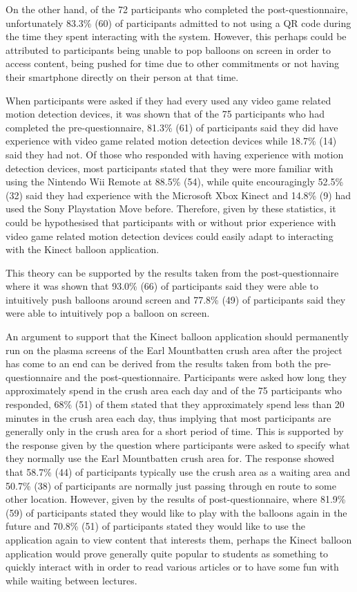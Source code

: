 On the other hand, of the 72 participants who completed the post-questionnaire, unfortunately 83.3\% (60) of participants admitted to not using a QR code during the time they spent interacting with the system. However, this perhaps could be attributed to participants being unable to pop balloons on screen in order to access content, being pushed for time due to other commitments or not having their smartphone directly on their person at that time.

When participants were asked if they had every used any video game related motion detection devices, it was shown that of the 75 participants who had completed the pre-questionnaire, 81.3\% (61) of participants said they did have experience with video game related motion detection devices while 18.7\% (14) said they had not. Of those who responded with having experience with motion detection devices, most participants stated that they were more familiar with using the Nintendo Wii Remote at 88.5\% (54), while quite encouragingly 52.5\% (32) said they had experience with the Microsoft Xbox Kinect and 14.8\% (9) had used the Sony Playstation Move before. Therefore, given by these statistics, it could be hypothesised that participants with or without prior experience with video game related motion detection devices could easily adapt to interacting with the Kinect balloon application.

This theory can be supported by the results taken from the post-questionnaire where it was shown that 93.0\% (66) of participants said they were able to intuitively push balloons around screen and 77.8\% (49) of participants said they were able to intuitively pop a balloon on screen.

An argument to support that the Kinect balloon application should permanently run on the  plasma screens of the Earl Mountbatten crush area after the project has come to an end can be derived from the results taken from both the pre-questionnaire and the post-questionnaire. Participants were asked how long they approximately spend in the crush area each day and of the 75 participants who responded, 68\% (51) of them stated that they approximately spend less than 20 minutes in the crush area each day, thus implying that most participants are generally only in the crush area for a short period of time. This is supported by the response given by the question where participants were asked to specify what they normally use the Earl Mountbatten crush area for. The response showed that 58.7\% (44) of participants typically use the crush area as a waiting area and 50.7\% (38) of participants are normally just passing through en route to some other location. However, given by the results of post-questionnaire, where 81.9\% (59) of participants stated they would like to play with the balloons again in the future and 70.8\% (51) of participants stated they would like to use the application again to view content that interests them, perhaps the Kinect balloon application would prove generally quite popular to students as something to quickly interact with in order to read various articles or to have some fun with while waiting between lectures.

